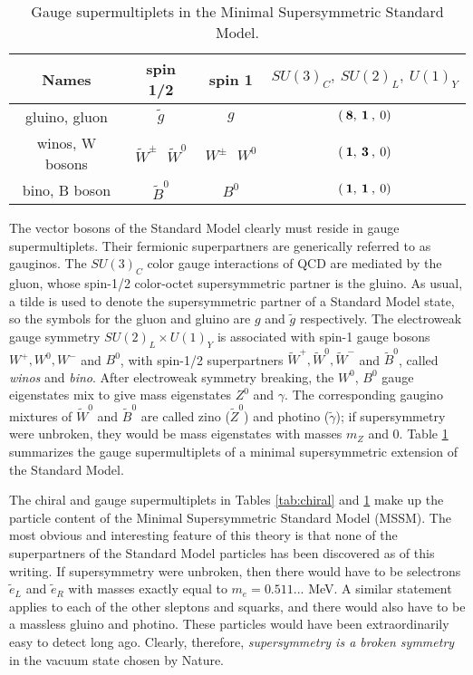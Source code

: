 \documentclass[12pt]{article}
\def\stilde{\widetilde}
\begin{document}
\renewcommand{\arraystretch}{1.55}
\begin{table}[t]
\begin{center}
\begin{tabular}{|c|c|c|c|}
\hline
Names & spin 1/2 & spin 1 & $SU(3)_C, \> SU(2)_L,\> U(1)_Y$\\
\hline\hline
gluino, gluon &$ \stilde g$& $g$ & $(\>{\bf 8},\>{\bf 1}\>,\> 0)$
\\
\hline
winos, W bosons & $ \stilde W^\pm\>\>\> \stilde W^0 $&
 $W^\pm\>\>\> W^0$ & $(\>{\bf 1},\>{\bf 3}\>,\> 0)$
\\
\hline
bino, B boson &$\stilde B^0$&
 $B^0$ & $(\>{\bf 1},\>{\bf 1}\>,\> 0)$
\\
\hline
\end{tabular}
\caption{Gauge supermultiplets in
the Minimal Supersymmetric Standard Model.\label{tab:gauge}}
\vspace{-0.45cm}
\end{center}
\end{table}
The vector bosons of the Standard Model clearly must reside in gauge
supermultiplets. Their fermionic superpartners are generically referred to
as gauginos. The $SU(3)_C$ color gauge interactions of QCD are mediated by
the gluon, whose spin-1/2 color-octet supersymmetric partner is the
gluino. As usual, a tilde is used to denote the supersymmetric partner of
a Standard Model state, so the symbols for the gluon and gluino are $g$
and $\stilde g$ respectively. The electroweak gauge symmetry
$SU(2)_L\times U(1)_Y$ is associated with spin-1 gauge bosons $W^+, W^0,
W^-$ and $B^0$, with spin-1/2 superpartners $\stilde W^+, \stilde W^0,
\stilde W^-$ and $\stilde B^0$, called {\it winos} and {\it bino}. After
electroweak symmetry breaking, the $W^0$, $B^0$ gauge eigenstates mix to
give mass eigenstates $Z^0$ and $\gamma$. The corresponding gaugino
mixtures of $\stilde W^0$ and $\stilde B^0$ are called zino ($\stilde Z^0$) 
and photino ($\stilde \gamma$); if supersymmetry were unbroken, they would
be mass eigenstates with masses $m_Z$ and 0. Table \ref{tab:gauge} 
summarizes the gauge
supermultiplets of a minimal supersymmetric extension of the Standard
Model. 

The chiral and gauge supermultiplets in Tables \ref{tab:chiral} and 
\ref{tab:gauge} make up the
particle content of the Minimal Supersymmetric Standard Model (MSSM). The
most obvious and interesting feature of this theory is that none of the
superpartners of the Standard Model particles has been discovered as of
this writing. If supersymmetry were unbroken, then there would have to be
selectrons $\stilde e_L$ and $\stilde e_R$ with masses exactly equal to
$m_e = 0.511...$ MeV. A similar statement applies to each of the other
sleptons and squarks, and there would also have to be a massless gluino
and photino. These particles would have been extraordinarily easy to
detect long ago. Clearly, therefore, {\it supersymmetry is a broken
symmetry} in the vacuum state chosen by Nature. 
\end{document}
